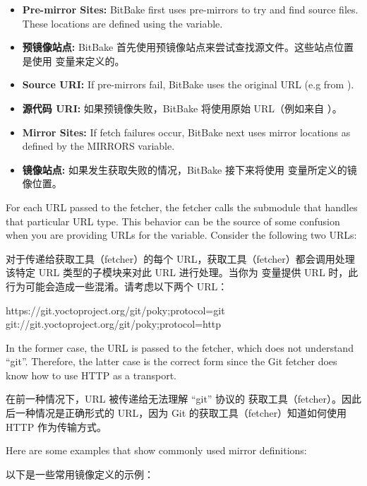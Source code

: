 \begin{itemize}
\setlength\itemsep{1.0em}
\item \textbf{Pre-mirror Sites:} BitBake first uses pre-mirrors to try and find source files. These locations are defined using the  variable.
\item \textbf{预镜像站点:} BitBake 首先使用预镜像站点来尝试查找源文件。这些站点位置是使用  变量来定义的。

\item \textbf{Source URI:} If pre-mirrors fail, BitBake uses the original URL (e.g from ).
\item \textbf{源代码 URI:} 如果预镜像失败，BitBake 将使用原始 URL（例如来自 ）。

\item \textbf{Mirror Sites:} If fetch failures occur, BitBake next uses mirror locations as defined by the MIRRORS variable.
\item \textbf{镜像站点:} 如果发生获取失败的情况，BitBake 接下来将使用  变量所定义的镜像位置。
\end{itemize}

For each URL passed to the fetcher, the fetcher calls the submodule that handles that particular URL type. This behavior can be the source of some confusion when you are providing URLs for the  variable. Consider the following two URLs:

对于传递给获取工具（fetcher）的每个 URL，获取工具（fetcher）都会调用处理该特定 URL 类型的子模块来对此 URL 进行处理。当你为  变量提供 URL 时，此行为可能会造成一些混淆。请考虑以下两个 URL：

\begin{pyglist}
https://git.yoctoproject.org/git/poky;protocol=git
git://git.yoctoproject.org/git/poky;protocol=http
\end{pyglist}

In the former case, the URL is passed to the  fetcher, which does not understand ``git''. Therefore, the latter case is the correct form since the Git fetcher does know how to use HTTP as a transport.

在前一种情况下，URL 被传递给无法理解 ``git'' 协议的  获取工具（fetcher）。因此后一种情况是正确形式的 URL，因为 Git 的获取工具（fetcher）知道如何使用 HTTP 作为传输方式。

Here are some examples that show commonly used mirror definitions:

以下是一些常用镜像定义的示例：

